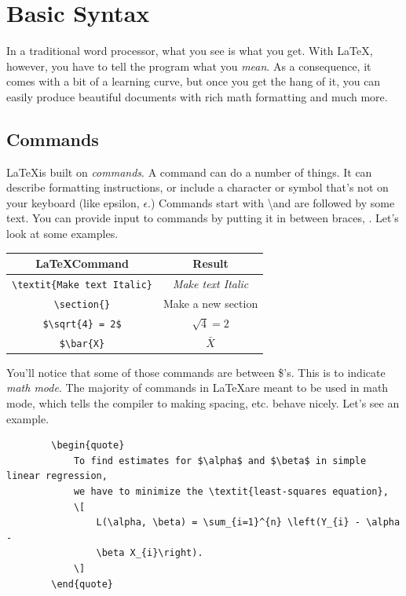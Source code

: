 \documentclass[12pt]{article}
\begin{document}
	
	\section{Basic Syntax}
	
	In a traditional word processor, what you see is what you get. With \LaTeX, however, you have to tell the program what you \textit{mean}. As a consequence, it comes with a bit of a learning curve, but once you get the hang of it, you can easily produce beautiful documents with rich math formatting and much more.
	
	\subsection{Commands}
	
	\LaTeX is built on \textit{commands}. A command can do a number of things. It can describe formatting instructions, or include a character or symbol that's not on your keyboard (like epsilon, $\epsilon$.) Commands start with \textbackslash and are followed by some text. You can provide input to commands by putting it in between braces, \textbraceleft \textbraceright. Let's look at some examples.
	
	\begin{table}[H]
		\centering
		\begin{tabular}{c|c}
			\textbf{\LaTeX Command} & \textbf{Result} \\ \hline
			\verb|\textit{Make text Italic}| & \textit{Make text Italic} \\
			\verb|\section{}| & Make a new section \\
			\verb|$\sqrt{4} = 2$| & $\sqrt{4} = 2$ \\ 
			\verb|$\bar{X}| & $\bar{X}$
		\end{tabular}
	\end{table}
	
	You'll notice that some of those commands are between \$'s. This is to indicate \textit{math mode}. The majority of commands in \LaTeX are meant to be used in math mode, which tells the compiler to making spacing, etc. behave nicely. Let's see an example.
	
	\begin{verbatim}
		\begin{quote}
		    To find estimates for $\alpha$ and $\beta$ in simple linear regression, 
		    we have to minimize the \textit{least-squares equation},
	    	\[
	            L(\alpha, \beta) = \sum_{i=1}^{n} \left(Y_{i} - \alpha - 
	            \beta X_{i}\right).
		    \]
		\end{quote}
	\end{verbatim}
	
\end{document}
